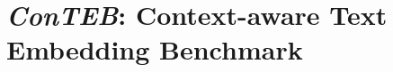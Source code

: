 

\section{\textit{ConTEB}: Context-aware Text Embedding Benchmark}


\label{section:loco_benchmark}

